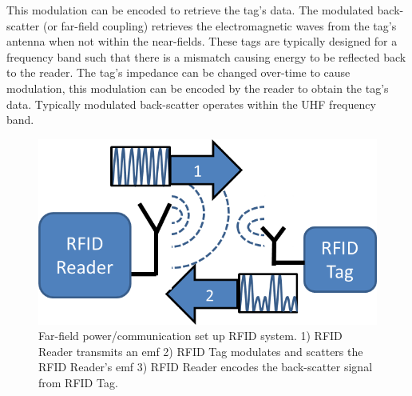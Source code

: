 This modulation can be encoded to retrieve the tag's data. The modulated back-scatter (or far-field coupling) retrieves the electromagnetic waves from the tag's antenna when not within the near-fields. These tags are typically designed for a frequency band such that there is a mismatch causing energy to be reflected back to the reader. The tag's impedance can be changed over-time to cause modulation, this modulation can be encoded by the reader to obtain the tag's data. Typically modulated back-scatter operates within the UHF frequency band. 

\begin{figure}[htp]
    \centering
    \includegraphics[scale=1.2]{Figs/FF_BS.png}
    \caption{Far-field power/communication set up RFID system. 1) RFID Reader transmits an emf 2) RFID Tag modulates and scatters the RFID Reader's emf 3) RFID Reader encodes the back-scatter signal from RFID Tag.}
    \label{fig:RFIDBlocks}
\end{figure}